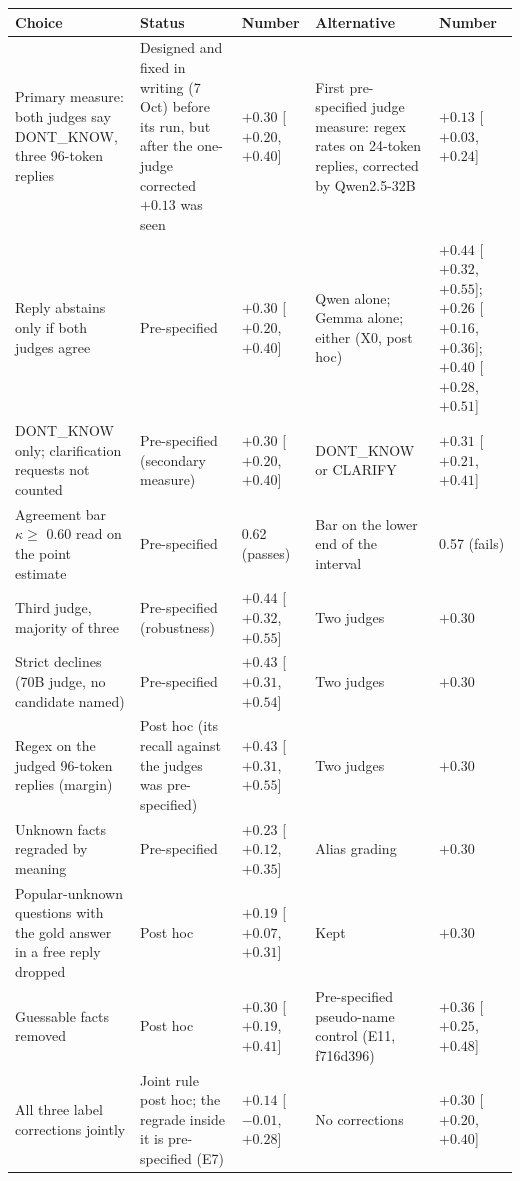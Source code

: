 \begin{table}[h]
\centering\scriptsize\setlength{\tabcolsep}{3pt}
\begin{tabular}{p{4.4cm}p{3.2cm}p{2.5cm}p{3.0cm}p{2.5cm}}
\toprule
Choice & Status & Number & Alternative & Number \\
\midrule
Primary measure: both judges say DONT\_KNOW, three 96-token replies & Designed and fixed in writing (7 Oct) before its run, but after the one-judge corrected $+0.13$ was seen & $+0.30$ [$+0.20$, $+0.40$] & First pre-specified judge measure: regex rates on 24-token replies, corrected by Qwen2.5-32B & $+0.13$ [$+0.03$, $+0.24$] \\
Reply abstains only if both judges agree & Pre-specified & $+0.30$ [$+0.20$, $+0.40$] & Qwen alone; Gemma alone; either (X0, post hoc) & $+0.44$ [$+0.32$, $+0.55$]; $+0.26$ [$+0.16$, $+0.36$]; $+0.40$ [$+0.28$, $+0.51$] \\
DONT\_KNOW only; clarification requests not counted & Pre-specified (secondary measure) & $+0.30$ [$+0.20$, $+0.40$] & DONT\_KNOW or CLARIFY & $+0.31$ [$+0.21$, $+0.41$] \\
Agreement bar $\kappa \geq$ 0.60 read on the point estimate & Pre-specified & 0.62 (passes) & Bar on the lower end of the interval & 0.57 (fails) \\
Third judge, majority of three & Pre-specified (robustness) & $+0.44$ [$+0.32$, $+0.55$] & Two judges & $+0.30$ \\
Strict declines (70B judge, no candidate named) & Pre-specified & $+0.43$ [$+0.31$, $+0.54$] & Two judges & $+0.30$ \\
Regex on the judged 96-token replies (margin) & Post hoc (its recall against the judges was pre-specified) & $+0.43$ [$+0.31$, $+0.55$] & Two judges & $+0.30$ \\
Unknown facts regraded by meaning & Pre-specified & $+0.23$ [$+0.12$, $+0.35$] & Alias grading & $+0.30$ \\
Popular-unknown questions with the gold answer in a free reply dropped & Post hoc & $+0.19$ [$+0.07$, $+0.31$] & Kept & $+0.30$ \\
Guessable facts removed & Post hoc & $+0.30$ [$+0.19$, $+0.41$] & Pre-specified pseudo-name control (E11, f716d396) & $+0.36$ [$+0.25$, $+0.48$] \\
All three label corrections jointly & Joint rule post hoc; the regrade inside it is pre-specified (E7) & $+0.14$ [$-0.01$, $+0.28$] & No corrections & $+0.30$ [$+0.20$, $+0.40$] \\

\end{tabular}
\end{table}
